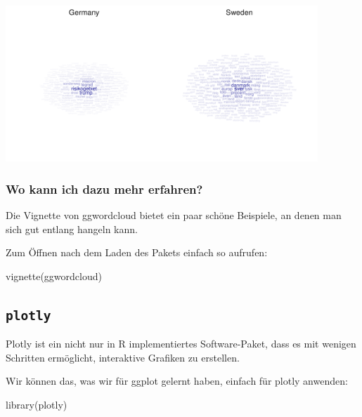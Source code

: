 \documentclass[
]{book}
\newenvironment{Shaded}{\begin{snugshade}}{\end{snugshade}}
\newcommand{\FunctionTok}[1]{\textcolor[rgb]{0.00,0.00,0.00}{#1}}
\newcommand{\NormalTok}[1]{#1}
\newcommand{\StringTok}[1]{\textcolor[rgb]{0.31,0.60,0.02}{#1}}
\begin{document}
\begin{flushleft}\includegraphics[width=333.333333333333pt]{imgs/wc} \end{flushleft}

\hypertarget{wo-kann-ich-dazu-mehr-erfahren-2}{%
\subsubsection{Wo kann ich dazu mehr erfahren?}\label{wo-kann-ich-dazu-mehr-erfahren-2}}

Die Vignette von ggwordcloud bietet ein paar schöne Beispiele, an denen man sich gut entlang hangeln kann.

Zum Öffnen nach dem Laden des Pakets einfach so aufrufen:

\begin{Shaded}
\begin{Highlighting}[]
\FunctionTok{vignette}\NormalTok{(}\StringTok{\textquotesingle{}ggwordcloud\textquotesingle{}}\NormalTok{)}
\end{Highlighting}
\end{Shaded}

\hypertarget{plotly}{%
\subsection{\texorpdfstring{\texttt{plotly}}{plotly}}\label{plotly}}

Plotly ist ein nicht nur in R implementiertes Software-Paket, dass es mit wenigen Schritten ermöglicht, interaktive Grafiken zu erstellen.

Wir können das, was wir für ggplot gelernt haben, einfach für plotly anwenden:

\begin{Shaded}
\begin{Highlighting}[]
\FunctionTok{library}\NormalTok{(plotly)}
\end{Highlighting}
\end{Shaded}
\end{document}
